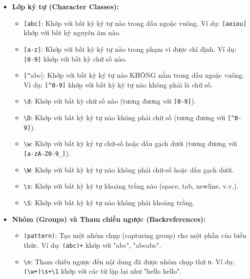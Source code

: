\documentclass[11pt]{article}
\begin{document}
\begin{itemize}
    \item \textbf{Lớp ký tự (Character Classes):}
    \begin{itemize}
        \item  \colorbox{codehighlight} {\texttt{[abc]}}: Khớp với bất kỳ ký tự nào trong dấu ngoặc vuông. Ví dụ: {\texttt{[aeiou]}} khớp với bất kỳ nguyên âm nào.
        \item  \colorbox{codehighlight} {\texttt{[a-z]}}: Khớp với bất kỳ ký tự nào trong phạm vi được chỉ định. Ví dụ: {\texttt{[0-9]}} khớp với bất kỳ chữ số nào.
        \item  \colorbox{codehighlight} {\texttt{[{\textasciicircum}}abc]}: Khớp với bất kỳ ký tự nào KHÔNG nằm trong dấu ngoặc vuông. Ví dụ: {\texttt{[{\textasciicircum}0-9]}} khớp với bất kỳ ký tự nào không phải là chữ số.
        \item  \colorbox{codehighlight} {\texttt{\textbackslash d}}: Khớp với bất kỳ chữ số nào (tương đương với {\texttt{[0-9]}}).
        \item  \colorbox{codehighlight} {\texttt{\textbackslash D}}: Khớp với bất kỳ ký tự nào không phải chữ số (tương đương với {\texttt{[{\textasciicircum}0-9]}}).
        \item  \colorbox{codehighlight} {\texttt{\textbackslash w}}: Khớp với bất kỳ ký tự chữ-số hoặc dấu gạch dưới (tương đương với {\texttt{[a-zA-Z0-9\_]}}).
        \item  \colorbox{codehighlight} {\texttt{\textbackslash W}}: Khớp với bất kỳ ký tự nào không phải chữ-số hoặc dấu gạch dưới.
        \item  \colorbox{codehighlight} {\texttt{\textbackslash s}}: Khớp với bất kỳ ký tự khoảng trắng nào (space, tab, newline, v.v.).
        \item  \colorbox{codehighlight} {\texttt{\textbackslash S}}: Khớp với bất kỳ ký tự nào không phải khoảng trắng.
    \end{itemize}

    \item \textbf{Nhóm (Groups) và Tham chiếu ngược (Backreferences):}
    \begin{itemize}
        \item  \colorbox{codehighlight} {\texttt{(pattern)}}: Tạo một nhóm chụp (capturing group) cho một phần của biểu thức. Ví dụ: {\texttt{(abc)+}} khớp với "abc", "abcabc".
        \item  \colorbox{codehighlight} {\texttt{\textbackslash n}}: Tham chiếu ngược đến nội dung đã được nhóm chụp thứ \texttt{n}. Ví dụ: {\texttt{(\textbackslash w+)\textbackslash s+\textbackslash 1}} khớp với các từ lặp lại như "hello hello".
    \end{itemize}


\end{itemize}
\end{document}
